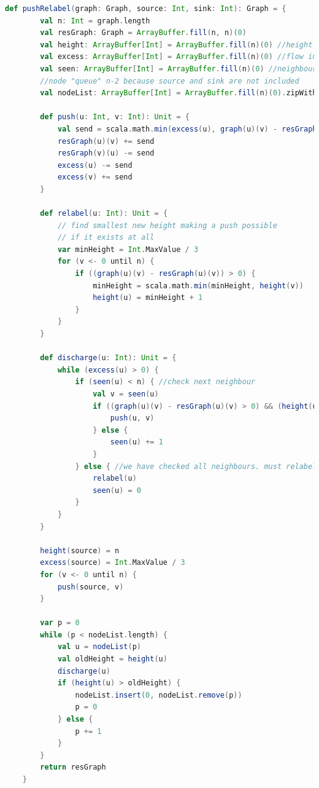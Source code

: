 \documentclass[12pt]{article} %
\begin{document}
\begin{lstlisting}[language=Scala, caption=Preflow-Push in Scala]
def pushRelabel(graph: Graph, source: Int, sink: Int): Graph = {
        val n: Int = graph.length
        val resGraph: Graph = ArrayBuffer.fill(n, n)(0)
        val height: ArrayBuffer[Int] = ArrayBuffer.fill(n)(0) //height of node
        val excess: ArrayBuffer[Int] = ArrayBuffer.fill(n)(0) //flow into node minus flow from node
        val seen: ArrayBuffer[Int] = ArrayBuffer.fill(n)(0) //neighbours seen since last relabel
        //node "queue" n-2 because source and sink are not included
        val nodeList: ArrayBuffer[Int] = ArrayBuffer.fill(n)(0).zipWithIndex.map(t => t._2).filterNot(e => (e == source) || (e == sink))

        def push(u: Int, v: Int): Unit = {
            val send = scala.math.min(excess(u), graph(u)(v) - resGraph(u)(v))
            resGraph(u)(v) += send
            resGraph(v)(u) -= send
            excess(u) -= send
            excess(v) += send
        }

        def relabel(u: Int): Unit = {
            // find smallest new height making a push possible
            // if it exists at all
            var minHeight = Int.MaxValue / 3
            for (v <- 0 until n) {
                if ((graph(u)(v) - resGraph(u)(v)) > 0) {
                    minHeight = scala.math.min(minHeight, height(v))
                    height(u) = minHeight + 1
                }
            }
        }

        def discharge(u: Int): Unit = {
            while (excess(u) > 0) {
                if (seen(u) < n) { //check next neighbour
                    val v = seen(u)
                    if ((graph(u)(v) - resGraph(u)(v) > 0) && (height(u) > height(v))) {
                        push(u, v)
                    } else {
                        seen(u) += 1
                    }
                } else { //we have checked all neighbours. must relabel
                    relabel(u)
                    seen(u) = 0
                }
            }
        }

        height(source) = n
        excess(source) = Int.MaxValue / 3
        for (v <- 0 until n) {
            push(source, v)
        }

        var p = 0
        while (p < nodeList.length) {
            val u = nodeList(p)
            val oldHeight = height(u)
            discharge(u)
            if (height(u) > oldHeight) {
                nodeList.insert(0, nodeList.remove(p))
                p = 0
            } else {
                p += 1
            }
        }
        return resGraph
    }
\end{lstlisting}
\end{document}
